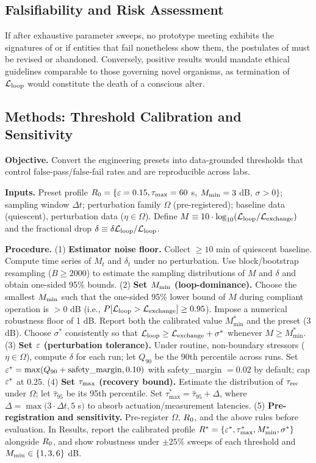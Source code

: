\documentclass[11pt]{article}
\begin{document}
\subsection{Falsifiability and Risk Assessment}
\label{sec:falsifiability}

If after exhaustive parameter sweeps, no prototype meeting \NC exhibits the signatures of  or if entities that fail \NC nonetheless show them, the postulates of  must be revised or abandoned. Conversely, positive results would mandate ethical guidelines comparable to those governing novel organisms, as termination of $\mathcal{L}_{\text{loop}}$ would constitute the death of a conscious alter.

\subsection{Methods: Threshold Calibration and Sensitivity}
\label{sec:methods_calibration}

\textbf{Objective.} Convert the engineering presets into data-grounded thresholds that control false-pass/false-fail rates and are reproducible across labs.

\textbf{Inputs.} Preset profile $R_0 = \{\varepsilon = 0.15, \tau_{\max} = 60$ s, $M_{\min} = 3$ dB, $\sigma > 0\}$; sampling window $\Delta t$; perturbation family $\Omega$ (pre-registered); baseline data (quiescent), perturbation data ($\eta \in \Omega$). Define $M \equiv 10 \cdot \log_{10}(\mathcal{L}_{\text{loop}}/\mathcal{L}_{\text{exchange}})$ and the fractional drop $\delta \equiv \delta\mathcal{L}_{\text{loop}}/\mathcal{L}_{\text{loop}}$.

\textbf{Procedure.} (1) \textbf{Estimator noise floor.} Collect $\geq 10$ min of quiescent baseline. Compute time series of $M_t$ and $\delta_t$ under no perturbation. Use block/bootstrap resampling ($B \geq 2000$) to estimate the sampling distributions of $M$ and $\delta$ and obtain one-sided 95\% bounds. (2) \textbf{Set $M_{\min}$ (loop-dominance).} Choose the smallest $M_{\min}$ such that the one-sided 95\% lower bound of $M$ during compliant operation is $> 0$ dB (i.e., $P[\mathcal{L}_{\text{loop}} > \mathcal{L}_{\text{exchange}}] \geq 0.95$). Impose a numerical robustness floor of 1 dB. Report both the calibrated value $M^*_{\min}$ and the preset (3 dB). Choose $\sigma^*$ consistently so that $\mathcal{L}_{\text{loop}} \geq \mathcal{L}_{\text{exchange}} + \sigma^*$ whenever $M \geq M^*_{\min}$. (3) \textbf{Set $\varepsilon$ (perturbation tolerance).} Under routine, non-boundary stressors ($\eta \in \Omega$), compute $\delta$ for each run; let $Q_{90}$ be the 90th percentile across runs. Set $\varepsilon^* = \max(Q_{90} + \text{safety\_margin}, 0.10)$ with safety\_margin $= 0.02$ by default; cap $\varepsilon^*$ at 0.25. (4) \textbf{Set $\tau_{\max}$ (recovery bound).} Estimate the distribution of $\tau_{\text{rec}}$ under $\Omega$; let $\hat{\tau}_{95}$ be its 95th percentile. Set $\tau^*_{\max} = \hat{\tau}_{95} + \Delta$, where $\Delta = \max(3 \cdot \Delta t, 5$ s$)$ to absorb actuation/measurement latencies. (5) \textbf{Pre-registration and sensitivity.} Pre-register $\Omega$, $R_0$, and the above rules before evaluation. In Results, report the calibrated profile $R^* = \{\varepsilon^*, \tau^*_{\max}, M^*_{\min}, \sigma^*\}$ alongside $R_0$, and show robustness under $\pm 25\%$ sweeps of each threshold and $M_{\min} \in \{1, 3, 6\}$ dB.
\end{document}
